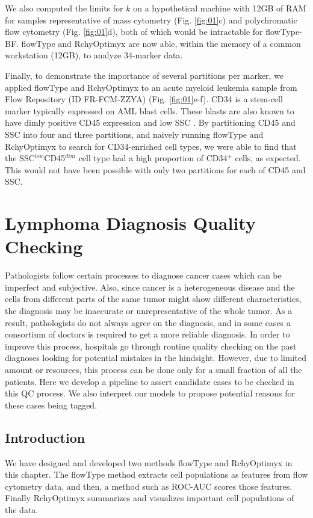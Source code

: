 We also computed the limits for $k$ on a hypothetical machine with 12GB of RAM for samples representative of mass cytometry (Fig. \ref{fig:01}c) and polychromatic flow cytometry (Fig. \ref{fig:01}d), both of which would be intractable for flowType-BF.
flowType and RchyOptimyx are now able, within the memory of a common workstation (12GB), to analyze 34-marker data. 

Finally, to demonstrate the importance of several partitions per marker, we applied flowType and RchyOptimyx to an acute myeloid leukemia sample from Flow Repository (ID FR-FCM-ZZYA) (Fig. \ref{fig:01}e-f).
CD34 is a stem-cell marker typically expressed on AML blast cells. These blasts are also known to have dimly positive CD45 expression and low SSC \cite{Vial2001}. 
By partitioning CD45 and SSC into four and three partitions, and naively running flowType and RchyOptimyx to search for CD34-enriched cell types, we were able to find that the SSC$^{low}$CD45$^{dim}$ cell type had a high proportion of CD34$^+$ cells, as expected.
This would not have been possible with only two partitions for each of CD45 and SSC.


\section{Lymphoma Diagnosis Quality Checking}
Pathologists follow certain processes to diagnose cancer cases which can be imperfect and subjective. Also, since cancer is a heterogeneous disease and the cells from different parts of the same tumor might show different characteristics, the diagnosis may be inaccurate or unrepresentative of the whole tumor. As a result, pathologists do not always agree on the diagnosis, and in some cases a consortium of doctors is required to get a more reliable diagnosis. In order to improve this process, hospitals go through routine quality checking on the past diagnoses looking for potential mistakes in the hindsight. However, due to limited amount or resources, this process can be done only for a small fraction of all the patients. Here we develop a pipeline to assert candidate cases to be checked in this QC process. We also interpret our models to propose potential reasons for these cases being tagged.

\subsection{Introduction}
We have designed and developed two methods flowType and RchyOptimyx in this chapter.
The flowType method extracts cell populations as features from flow cytometry data, and then, a method such as ROC-AUC scores those features. Finally RchyOptimyx summarizes and visualizes important cell populations of the data.

